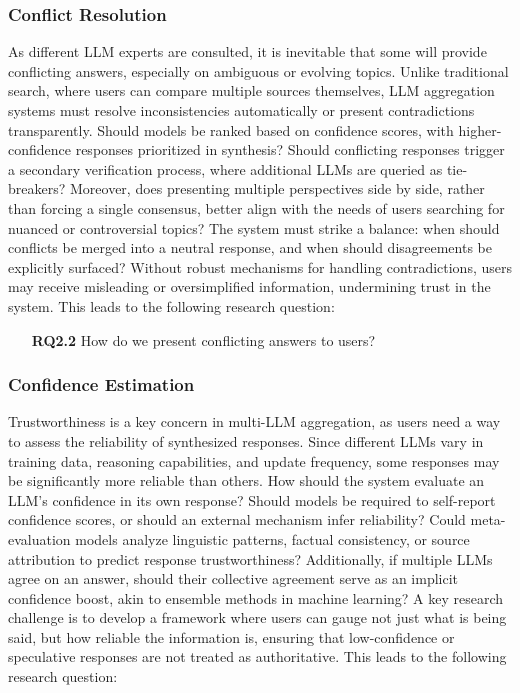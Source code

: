 \subsubsection{Conflict Resolution}
As different LLM experts are consulted, it is inevitable that some will provide conflicting answers, especially on ambiguous or evolving topics. Unlike traditional search, where users can compare multiple sources themselves, LLM aggregation systems must resolve inconsistencies automatically or present contradictions transparently. Should models be ranked based on confidence scores, with higher-confidence responses prioritized in synthesis? Should conflicting responses trigger a secondary verification process, where additional LLMs are queried as tie-breakers? Moreover, does presenting multiple perspectives side by side, rather than forcing a single consensus, better align with the needs of users searching for nuanced or controversial topics? The system must strike a balance: when should conflicts be merged into a neutral response, and when should disagreements be explicitly surfaced? Without robust mechanisms for handling contradictions, users may receive misleading or oversimplified information, undermining trust in the system. This leads to the following research question:

\begin{itemize}
    \item[\textbf{RQ2.2}] How do we present conflicting answers to users?
\end{itemize}

\subsubsection{Confidence Estimation}
Trustworthiness is a key concern in multi-LLM aggregation, as users need a way to assess the reliability of synthesized responses. Since different LLMs vary in training data, reasoning capabilities, and update frequency, some responses may be significantly more reliable than others. How should the system evaluate an LLM's confidence in its own response? Should models be required to self-report confidence scores, or should an external mechanism infer reliability? Could meta-evaluation models analyze linguistic patterns, factual consistency, or source attribution to predict response trustworthiness? Additionally, if multiple LLMs agree on an answer, should their collective agreement serve as an implicit confidence boost, akin to ensemble methods in machine learning? A key research challenge is to develop a framework where users can gauge not just what is being said, but how reliable the information is, ensuring that low-confidence or speculative responses are not treated as authoritative. This leads to the following research question:

